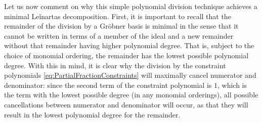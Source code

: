 Let us now comment on why this simple polynomial division technique achieves a
minimal Leǐnartas decomposition. First, it is important to recall that
the remainder of the division by a Gröbner basis is minimal in the sense that
it cannot be written in terms of a member of the ideal and a new remainder
without that remainder having higher polynomial degree. That is, subject to the
choice of monomial ordering, the remainder has the lowest possible polynomial
degree. With this in mind, it is clear why the division by the constraint
polynomials \eqref{eq:PartialFractionConstraints} will maximally cancel
numerator and denominator: since the second term of the constraint polynomial is
$1$, which is the term with the lowest possible degree (in any monomial orderings),
all possible cancellations between numerator and denominator will occur, as that they
will result in the lowest polynomial degree for the remainder.


